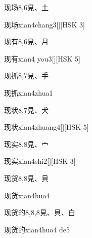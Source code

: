 \begin{entry}{现场}{8,6}{⾒、⼟}
  \begin{phonetics}{现场}{xian4chang3}[][HSK 3]
  \end{phonetics}
\end{entry}

\begin{entry}{现有}{8,6}{⾒、⽉}
  \begin{phonetics}{现有}{xian4 you3}[][HSK 5]
  \end{phonetics}
\end{entry}

\begin{entry}{现抓}{8,7}{⾒、⼿}
  \begin{phonetics}{现抓}{xian4zhua1}
  \end{phonetics}
\end{entry}

\begin{entry}{现状}{8,7}{⾒、⽝}
  \begin{phonetics}{现状}{xian4zhuang4}[][HSK 5]
  \end{phonetics}
\end{entry}

\begin{entry}{现实}{8,8}{⾒、⼧}
  \begin{phonetics}{现实}{xian4shi2}[][HSK 3]
  \end{phonetics}
\end{entry}

\begin{entry}{现货}{8,8}{⾒、⾙}
  \begin{phonetics}{现货}{xian4huo4}
  \end{phonetics}
\end{entry}

\begin{entry}{现货的}{8,8,8}{⾒、⾙、⽩}
  \begin{phonetics}{现货的}{xian4huo4 de5}
  \end{phonetics}
\end{entry}

